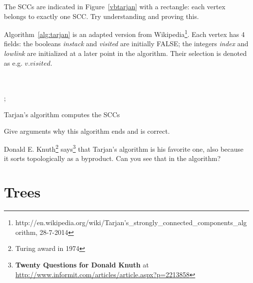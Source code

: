 The SCCs are indicated in Figure~\ref{vbtarjan} with a rectangle: each
vertex belongs to exactly one SCC. Try understanding and proving this.

Algorithm~\ref{alg:tarjan} is an adapted version from
Wikipedia\footnote{
http://en.wikipedia.org/wiki/Tarjan's\_strongly\_connected\_components\_algorithm,
28-7-2014}.
%
Each vertex has 4 fields: the booleans {\em instack} and {\em visited}
are initially FALSE; the integers {\em index} and {\em lowlink} are
initialized at a later point in the algorithm. Their selection is denoted as e.g. $v.visited$.

\begin{algorithm}[h]
\begin{algorithmic}

    \EndFor
\EndFunction
~\\
~\\
       ;
       \EndIf
\EndFor
    \Repeat
    \EndIf
\EndFunction

  \end{algorithmic}
  \caption{Tarjan's algorithm computes the SCCs}
  \label{alg:tarjan}
\end{algorithm}


Give arguments why this algorithm ends and is correct.

Donald E. Knuth\footnote{Turing award in 1974}
says\footnote{{\bf Twenty Questions for Donald Knuth} at
\url{http://www.informit.com/articles/article.aspx?p=2213858}} that Tarjan's
algorithm is his favorite one, also because it sorts topologically as
a byproduct. Can you see that in the algorithm?




\chapter{Trees}

